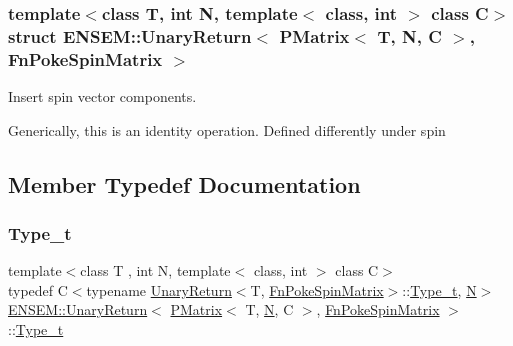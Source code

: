 \subsubsection*{template$<$class T, int N, template$<$ class, int $>$ class C$>$\newline
struct E\+N\+S\+E\+M\+::\+Unary\+Return$<$ P\+Matrix$<$ T, N, C $>$, Fn\+Poke\+Spin\+Matrix $>$}

Insert spin vector components. 

Generically, this is an identity operation. Defined differently under spin 

\subsection{Member Typedef Documentation}
\mbox{\label{structENSEM_1_1UnaryReturn_3_01PMatrix_3_01T_00_01N_00_01C_01_4_00_01FnPokeSpinMatrix_01_4_abbbfcc8a97ca25a57a700734961be247}} 
\subsubsection{\texorpdfstring{Type\_t}{Type\_t}\hspace{0.1cm}{\footnotesize\ttfamily [1/2]}}
{\footnotesize\ttfamily template$<$class T , int N, template$<$ class, int $>$ class C$>$ \\
typedef C$<$typename \mbox{\hyperlink{structENSEM_1_1UnaryReturn}{Unary\+Return}}$<$T, \mbox{\hyperlink{structENSEM_1_1FnPokeSpinMatrix}{Fn\+Poke\+Spin\+Matrix}}$>$\+::\mbox{\hyperlink{structENSEM_1_1UnaryReturn_3_01PMatrix_3_01T_00_01N_00_01C_01_4_00_01FnPokeSpinMatrix_01_4_abbbfcc8a97ca25a57a700734961be247}{Type\+\_\+t}}, \mbox{\hyperlink{operator__name__util_8cc_a7722c8ecbb62d99aee7ce68b1752f337}{N}}$>$ \mbox{\hyperlink{structENSEM_1_1UnaryReturn}{E\+N\+S\+E\+M\+::\+Unary\+Return}}$<$ \mbox{\hyperlink{classENSEM_1_1PMatrix}{P\+Matrix}}$<$ T, \mbox{\hyperlink{operator__name__util_8cc_a7722c8ecbb62d99aee7ce68b1752f337}{N}}, C $>$, \mbox{\hyperlink{structENSEM_1_1FnPokeSpinMatrix}{Fn\+Poke\+Spin\+Matrix}} $>$\+::\mbox{\hyperlink{structENSEM_1_1UnaryReturn_3_01PMatrix_3_01T_00_01N_00_01C_01_4_00_01FnPokeSpinMatrix_01_4_abbbfcc8a97ca25a57a700734961be247}{Type\+\_\+t}}}

